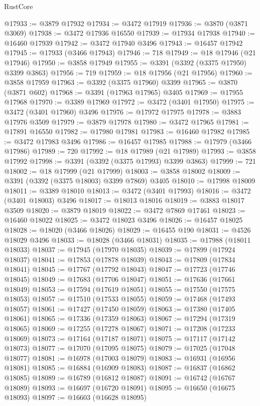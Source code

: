 \begin{lexlean}{RustCore}
\begin{coremodule}
@17933 := @3879 @17932
@17934 := @3472 @17919
@17936 := @3870 (@3871 @3069)
@17938 := @3472 @17936 @16550
@17939 := @17934 @17938
@17940 := @16460 @17939
@17942 := @3472 @17940 @3496
@17943 := @16457 @17942
@17945 := @17933 (@3466 @17943)
@17946 := 718
@17949 := @18 @17946 (@21 @17946)
@17950 := @3858 @17949
@17955 := @3391 (@3392 (@3375 @17950) @3399 @3863)
@17956 := 719
@17959 := @18 @17956 (@21 @17956)
@17960 := @3858 @17959
@17963 := @3392 (@3375 @17960) @3399
@17965 := @3870 (@3871 @602)
@17968 := @3391 (@17963 @17965) @3405
@17969 := @17955 @17968
@17970 := @3389 @17969
@17972 := @3472 (@3401 @17950)
@17975 := @3472 (@3401 @17960) @3496
@17976 := @17972 @17975
@17978 := @3883 @17976 @3509
@17979 := @3879 @17978
@17980 := @3472 @17965
@17981 := @17891 @16550
@17982 := @17980 @17981
@17983 := @16460 @17982
@17985 := @3472 @17983 @3496
@17986 := @16457 @17985
@17988 := @17979 (@3466 @17986)
@17989 := 720
@17992 := @18 @17989 (@21 @17989)
@17993 := @3858 @17992
@17998 := @3391 (@3392 (@3375 @17993) @3399 @3863)
@17999 := 721
@18002 := @18 @17999 (@21 @17999)
@18003 := @3858 @18002
@18009 := @3391 (@3392 (@3375 @18003) @3399 @7869) @3405
@18010 := @17998 @18009
@18011 := @3389 @18010
@18013 := @3472 (@3401 @17993)
@18016 := @3472 (@3401 @18003) @3496
@18017 := @18013 @18016
@18019 := @3883 @18017 @3509
@18020 := @3879 @18019
@18022 := @3472 @7869 @17461
@18023 := @16460 @18022
@18025 := @3472 @18023 @3496
@18026 := @16457 @18025
@18028 := @18020 (@3466 @18026)
@18029 := @16455 @190
@18031 := @4526 @18029 @3496
@18033 := @18028 (@3466 @18031)
@18035 := @17988 (@18011 @18033)
@18037 := @17945 (@17970 @18035)
@18039 := @17899 (@17924 @18037)
@18041 := @17853 (@17878 @18039)
@18043 := @17809 (@17834 @18041)
@18045 := @17767 (@17792 @18043)
@18047 := @17723 (@17746 @18045)
@18049 := @17683 (@17706 @18047)
@18051 := @17636 (@17661 @18049)
@18053 := @17594 (@17619 @18051)
@18055 := @17550 (@17575 @18053)
@18057 := @17510 (@17533 @18055)
@18059 := @17468 (@17493 @18057)
@18061 := @17427 (@17450 @18059)
@18063 := @17380 (@17405 @18061)
@18065 := @17336 (@17359 @18063)
@18067 := @17294 (@17319 @18065)
@18069 := @17255 (@17278 @18067)
@18071 := @17208 (@17233 @18069)
@18073 := @17164 (@17187 @18071)
@18075 := @17117 (@17142 @18073)
@18077 := @17070 (@17095 @18075)
@18079 := @17025 (@17048 @18077)
@18081 := @16978 (@17003 @18079)
@18083 := @16931 (@16956 @18081)
@18085 := @16884 (@16909 @18083)
@18087 := @16837 (@16862 @18085)
@18089 := @16789 (@16812 @18087)
@18091 := @16742 (@16767 @18089)
@18093 := @16697 (@16720 @18091)
@18095 := @16650 (@16675 @18093)
@18097 := @16603 (@16628 @18095)

\end{coremodule}
\end{lexlean}
